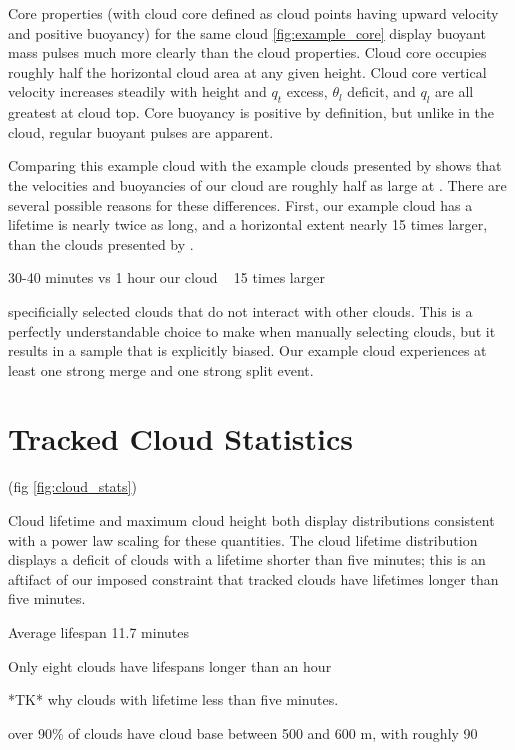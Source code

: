 \documentclass[acp]{copernicus}
\begin{document}
Core properties (with cloud core defined as cloud points having upward velocity
and positive buoyancy) for the same cloud \ref{fig:example_core} display 
buoyant mass pulses much more clearly than the cloud properties.  Cloud core 
occupies roughly half the horizontal cloud area at any given height.  Cloud 
core vertical velocity increases steadily with height and $q_t$ excess, 
$\theta_l$ deficit, and $q_l$ are all greatest at cloud top.  Core buoyancy 
is positive by definition, but unlike in the cloud, regular buoyant pulses are
apparent.

Comparing this example cloud with the example clouds presented by 
\citet[][figs. 4 and 5]{Heus2009} shows that the velocities and buoyancies of 
our cloud are roughly half as large at \citeauthor{Heus2009}.  There are 
several possible reasons for these differences.  First, our example cloud has 
a lifetime is nearly twice as long, and a horizontal extent nearly 15 times 
larger, than the clouds presented by \citeauthor{Heus2009}.

30-40 minutes vs 1 hour
our cloud ~ 15 times larger

\citeauthor{Heus2009} specificially selected clouds that do not interact with other 
clouds.  This is a perfectly understandable choice to make when manually 
selecting clouds, but it results in a sample that is explicitly biased.  Our 
example cloud experiences at least one strong merge and one strong split event.


\section{Tracked Cloud Statistics}

(fig \ref{fig:cloud_stats})

Cloud lifetime and maximum cloud height both display distributions consistent 
with a power law scaling for these quantities.  The cloud lifetime distribution 
displays a deficit of clouds with a lifetime shorter than five minutes; this is 
an aftifact of our imposed constraint that tracked clouds have lifetimes longer 
than five minutes.

Average lifespan 11.7 minutes

Only eight clouds have lifespans longer than an hour

*TK* why clouds with lifetime less than five minutes.

over 90\% of clouds have cloud base between 500 and 600 m, with roughly 90
\end{document}
